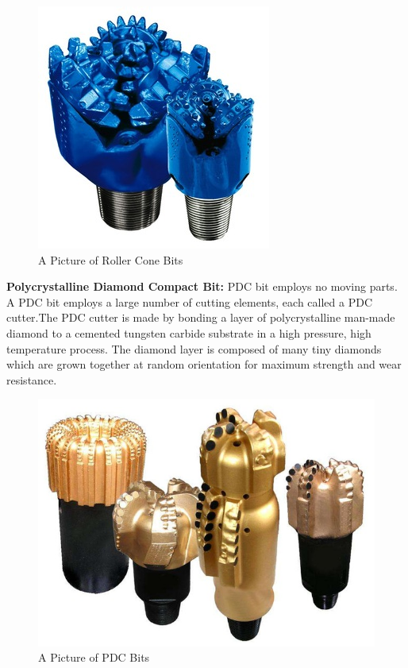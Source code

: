 \vspace{1em}

\begin{figure}[h]
\includegraphics[scale=0.3]{images/Rollerconebits}
\centering 
\caption{A Picture of Roller Cone Bits}
\end{figure}

\textbf{Polycrystalline Diamond Compact Bit:} PDC bit employs no moving parts. 
A PDC bit employs a large number of cutting elements, each called a PDC cutter.The PDC cutter is made 
by bonding a layer of polycrystalline man-made diamond to a cemented tungsten 
carbide substrate in a high pressure, high temperature process. 
The diamond layer is composed of many tiny diamonds which are grown together at random orientation for maximum strength and wear resistance.

\vspace{1em}

\begin{figure}[h]
\includegraphics[scale=0.3]{images/PDCbits}
\centering 
\caption{A Picture of PDC Bits}
\end{figure}


